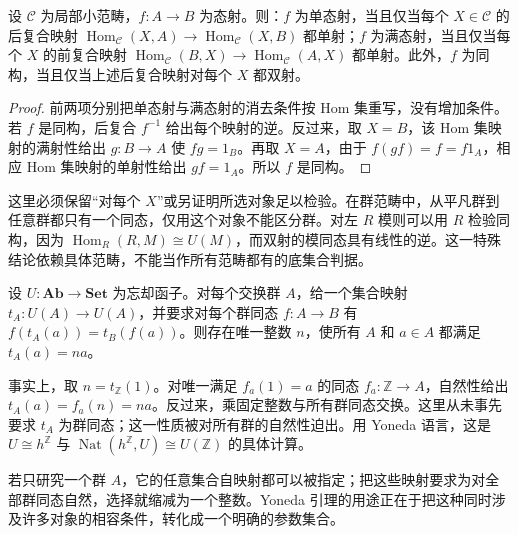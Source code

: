 \begin{proposition}\label{b4:prop:hom-detects-morphisms}
	设 \(\mathcal C\) 为局部小范畴，\(f:A\rightarrow B\) 为态射。则：\(f\) 为单态射，当且仅当每个 \(X\in\mathcal C\) 的后复合映射 \(\operatorname{Hom}_{\mathcal C}(X,A)\rightarrow\operatorname{Hom}_{\mathcal C}(X,B)\) 都单射；\(f\) 为满态射，当且仅当每个 \(X\) 的前复合映射 \(\operatorname{Hom}_{\mathcal C}(B,X)\rightarrow\operatorname{Hom}_{\mathcal C}(A,X)\) 都单射。此外，\(f\) 为同构，当且仅当上述后复合映射对每个 \(X\) 都双射。
\end{proposition}
\begin{proof}
	前两项分别把单态射与满态射的消去条件按 Hom 集重写，没有增加条件。若 \(f\) 是同构，后复合 \(f^{-1}\) 给出每个映射的逆。反过来，取 \(X=B\)，该 Hom 集映射的满射性给出 \(g:B\rightarrow A\) 使 \(fg=1_B\)。再取 \(X=A\)，由于 \(f(gf)=f=f1_A\)，相应 Hom 集映射的单射性给出 \(gf=1_A\)。所以 \(f\) 是同构。
\end{proof}

这里必须保留“对每个 \(X\)”或另证明所选对象足以检验。在群范畴中，从平凡群到任意群都只有一个同态，仅用这个对象不能区分群。对左 \(R\) 模则可以用 \(R\) 检验同构，因为 \(\operatorname{Hom}_R(R,M)\cong U(M)\)，而双射的模同态具有线性的逆。这一特殊结论依赖具体范畴，不能当作所有范畴都有的底集合判据。

\begin{example}[交换群中的自然一元运算]\label{b4:exm:yoneda-abelian-operations}
	设 \(U:\mathbf{Ab}\rightarrow\mathbf{Set}\) 为忘却函子。对每个交换群 \(A\)，给一个集合映射 \(t_A:U(A)\rightarrow U(A)\)，并要求对每个群同态 \(f:A\rightarrow B\) 有 \(f(t_A(a))=t_B(f(a))\)。则存在唯一整数 \(n\)，使所有 \(A\) 和 \(a\in A\) 都满足 \(t_A(a)=na\)。

	\ProseParagraphBreak
	事实上，取 \(n=t_{\mathbb Z}(1)\)。对唯一满足 \(f_a(1)=a\) 的同态 \(f_a:\mathbb Z\rightarrow A\)，自然性给出 \(t_A(a)=f_a(n)=na\)。反过来，乘固定整数与所有群同态交换。这里从未事先要求 \(t_A\) 为群同态；这一性质被对所有群的自然性迫出。用 Yoneda 语言，这是 \(U\cong h^{\mathbb Z}\) 与 \(\operatorname{Nat}(h^{\mathbb Z},U)\cong U(\mathbb Z)\) 的具体计算。
\end{example}

若只研究一个群 \(A\)，它的任意集合自映射都可以被指定；把这些映射要求为对全部群同态自然，选择就缩减为一个整数。Yoneda 引理的用途正在于把这种同时涉及许多对象的相容条件，转化成一个明确的参数集合。

